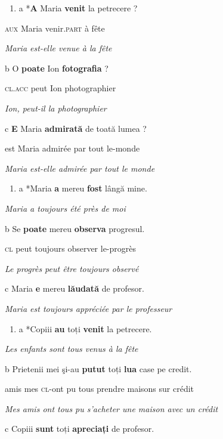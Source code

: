 \begin{enumerate}
\item \label{bkm:Ref299281523}a  *\textbf{A}  Maria  \textbf{venit}  la  petrecere ?


\end{enumerate}
\textsc{aux } Maria  venir.\textsc{part } à  fête

    \textit{Maria est-elle venue à la fête}  

  b  O  \textbf{poate}  Ion  \textbf{fotografia} ?

    \textsc{cl.acc } peut  Ion  photographier

    \textit{Ion, peut-il la photographier}

  c  \textbf{E}  Maria  \textbf{admirată}  de  toată  lumea ?

est  Maria  admirée  par  tout  le-monde

    \textit{Maria est-elle admirée par tout le monde}


\begin{enumerate}
\item \label{bkm:Ref299281528}a  *Maria \textbf{a} mereu \textbf{fost} lângă mine.


\end{enumerate}
    \textit{Maria a toujours été près de moi}

  b  Se  \textbf{poate}  mereu  \textbf{observa}  progresul.

    \textsc{cl } peut  toujours  observer  le-progrès

    \textit{Le progrès peut être toujours observé}  

  c  Maria \textbf{e} mereu \textbf{lăudată} de profesor.

    \textit{Maria est toujours appréciée par le professeur}


\begin{enumerate}
\item \label{bkm:Ref299279328}a  *Copiii \textbf{au} toți \textbf{venit} la petrecere.


\end{enumerate}
{\itshape
Les enfants sont tous venus à la fête}

  b  Prietenii  mei  şi-au  \textbf{putut } toți  \textbf{lua } case  pe  credit.

    amis  mes  \textsc{cl-}ont  pu  tous  prendre  maisons  sur  crédit

{\itshape
Mes amis ont tous pu s'acheter une maison avec un crédit}

  c  Copiii \textbf{sunt} toți \textbf{apreciați} de profesor.

